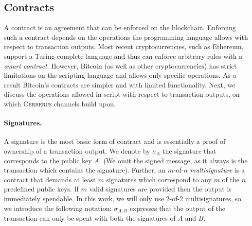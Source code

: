 \documentclass[runningheads]{llncs}
\newcommand{\sys}{\textsc{Cerberus}\xspace}
\begin{document}





\subsection{Contracts}
A contract is an agreement that can be enforced on the blockchain. 
Enforcing such a contract depends on the operations the programming language allows with respect to transaction outputs.
Most recent cryptocurrencies, such as Ethereum, support a 
Turing-complete language and thus can enforce arbitrary rules with a \textit{smart contract}. However, Bitcoin (as well as other cryptocurrencies) has strict limitations on the scripting language and allows only specific operations. As a result Bitcoin's contracts are simpler and with limited functionality. 
Next, we discuss the operations allowed in script with respect to transaction outputs, on which \sys channels build upon.

\paragraph{Signatures.} A signature is the most basic form of contract and is essentially a proof of ownership of a transaction output. We denote by $\sigma_A$ the signature that corresponds to the public key $A$. (We omit the signed message, as it always is the transaction which contains the signature).
Further, an $m$-of-$n$ \textit{multisignature} is a contract that demands at least $m$ signatures which correspond to  any $m$ of the $n$ predefined public keys. 
If $m$ valid signatures are provided then the output is immediately spendable. 
 In this work, we will only use 2-of-2 multisignatures, so we introduce the following notation: $\sigma_{A,B}$ expresses that the output of the transaction can only be spent with both the signatures of $A$ and $B$.
\end{document}

